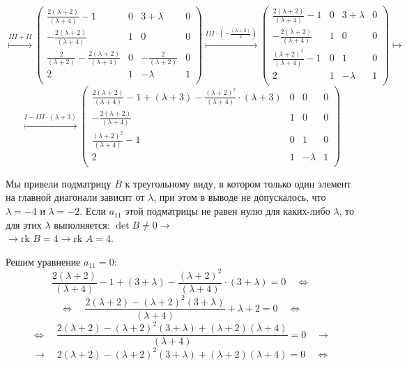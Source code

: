 \documentclass[a4paper,12pt]{article}
\begin{document}
$$
\overset{III+II}{\longmapsto}
\begin{pmatrix}
{\frac{2(\lambda+2)}{(\lambda+4)}-1}&{0}&{3+\lambda}&0\\
{-\frac{2(\lambda+2)}{(\lambda+4)}}&{1}&{0}&0\\
{\frac{2}{(\lambda+2)}-\frac{2(\lambda+2)}{(\lambda+4)}}&{0}&{-\frac{2}{(\lambda+2)}}&0\\
{2}&{1}&{-\lambda}&1\\
\end{pmatrix}
\overset{III \cdot (-\frac{(\lambda+2)}{2})}{\longmapsto}
\begin{pmatrix}
{\frac{2(\lambda+2)}{(\lambda+4)}-1}&{0}&{3+\lambda}&0\\
{-\frac{2(\lambda+2)}{(\lambda+4)}}&{1}&{0}&0\\
{\frac{(\lambda+2)^2}{(\lambda+4)}-1}&{0}&{1}&0\\
{2}&{1}&{-\lambda}&1\\
\end{pmatrix}
\longmapsto
$$
$$
\overset{I-III \cdot (\lambda+3)}{\longmapsto}
\begin{pmatrix}
{\frac{2(\lambda+2)}{(\lambda+4)}-1+(\lambda+3)-\frac{(\lambda+2)^2}{(\lambda+4)}\cdot (\lambda+3)}&{0}&{0}&0\\
{-\frac{2(\lambda+2)}{(\lambda+4)}}&{1}&{0}&0\\
{\frac{(\lambda+2)^2}{(\lambda+4)}-1}&{0}&{1}&0\\
{2}&{1}&{-\lambda}&1\\
\end{pmatrix}
$$\par
Мы привели подматрицу $B$ к треугольному виду, в котором только один элемент на главной диагонали зависит от $\lambda$, при этом в выводе не допускалось, что $\lambda = -4$ и $\lambda = -2$.
Если $a_{11}$ этой подматрицы не равен нулю для каких-либо $\lambda$, то для этих $\lambda$ выполняется: $\det B \neq 0 \longrightarrow$ \\ 
$\longrightarrow \text{rk }B = 4 \longrightarrow \text{rk }A = 4$. \par
Решим уравнение $a_{11}=0$:
$$\frac{2(\lambda+2)}{(\lambda+4)}-1+(3+\lambda)-\frac{(\lambda+2)^2}{(\lambda+4)}\cdot (3+\lambda)=0
\quad \Leftrightarrow$$
$$\Leftrightarrow \quad
\frac{2(\lambda+2)-(\lambda+2)^2(3+\lambda)}{(\lambda+4)}+\lambda+2=0 
\quad \Leftrightarrow$$
$$\Leftrightarrow \quad
\frac{2(\lambda+2)-(\lambda+2)^2(3+\lambda)+(\lambda+2)(\lambda+4)}{(\lambda+4)}=0 \quad \longrightarrow$$
$$ \longrightarrow \quad
2(\lambda+2)-(\lambda+2)^2(3+\lambda)+(\lambda+2)(\lambda+4)=0
\quad \Leftrightarrow$$
\end{document}
